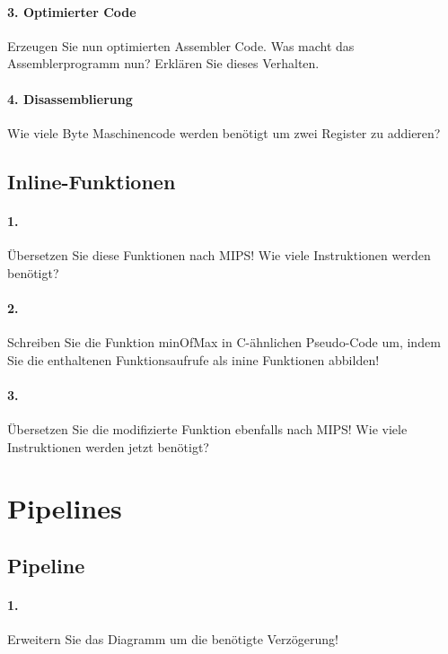 \documentclass[paper=a4, fontsize=11pt]{scrartcl}
\numberwithin{equation}{section}
\numberwithin{figure}{section}
\numberwithin{table}{section}
\begin{document}
\paragraph{3. Optimierter Code}
Erzeugen Sie nun optimierten Assembler Code. Was macht das Assemblerprogramm nun? Erklären Sie dieses Verhalten.

\paragraph{4. Disassemblierung}
Wie viele Byte Maschinencode werden benötigt um zwei Register zu addieren?

\subsection{Inline-Funktionen}

\paragraph{1.}
Übersetzen Sie diese Funktionen nach MIPS! Wie viele Instruktionen werden benötigt?

\paragraph{2.}
Schreiben Sie die Funktion minOfMax in C-ähnlichen Pseudo-Code um, indem Sie die enthaltenen Funktionsaufrufe als inine Funktionen abbilden!

\paragraph{3.}
Übersetzen Sie die modifizierte Funktion ebenfalls nach MIPS! Wie viele Instruktionen werden jetzt benötigt?

\section{Pipelines}
\subsection{Pipeline}

\paragraph{1.}
Erweitern Sie das Diagramm um die benötigte Verzögerung!
\end{document}
